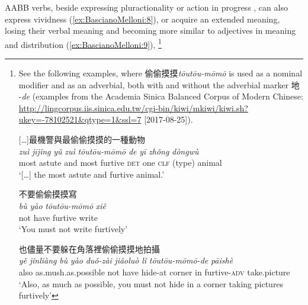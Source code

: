 \documentclass[output=paper]{langsci/langscibook}
\begin{document}
AABB verbs, beside expressing pluractionality or action in progress %
\citep[see][]{Hu06,Ding2010}%
%
, can also express vividness (\ref{ex:BascianoMelloni:8}), or acquire an
extended meaning, losing their verbal meaning and becoming more similar
to adjectives in meaning and distribution (\ref{ex:BascianoMelloni:9}),%
%
\footnote{See the following
  examples, where
  偷偷摸摸\emph{tōu}\tld{}\emph{tōu-mō}\tld{}\emph{mō}
  is used as a nominal modifier  and as an adverbial, both with
   and without  the
  adverbial marker 地 -\emph{de} (examples from the Academia Sinica
  Balanced Corpus of Modern Chinese:
  \url{http://lingcorpus.iis.sinica.edu.tw/cgi-bin/kiwi/mkiwi/kiwi.sh?ukey=-78102521&qtype=1&ssl=7}
  [2017-08-25]).

% 

\ea\label{fnex:basciano:a}
{[}\ldots{}{]}最機警與最偷偷摸摸的一種動物\\
\gll \emph{zuì} \emph{jījǐng} \emph{yǔ} \emph{zuì} \emph{tōu}\tld{}\emph{tōu-mō}\tld{}\emph{mō} \emph{de} \emph{yī} \emph{zhǒng} \emph{dòngwù}\\
most astute and most furtive \textsc{det} one {\textsc{clf} (type)} animal\\
\glt `{[}\ldots{}{]} the most astute and furtive animal.'

\ex
\ea\label{fnex:basciano:bi}
不要偷偷摸摸寫\\
\gll \emph{bù} \emph{yào} \emph{tōu}\tld{}\emph{tōu-mō}\tld{}\emph{mō} \emph{xiě}\\
not have furtive write\\
\glt `You must not write furtively'

\ex\label{fnex:basciano:bii}
也儘量不要躲在角落裡偷偷摸摸地拍攝\\
\gll\emph{yě} \emph{jǐnliàng} \emph{bù} \emph{yào} \emph{duǒ-zài} \emph{jiǎoluò} \emph{lǐ} \emph{tōu}\tld{}\emph{tōu-mō}\tld{}\emph{mō-de} \emph{pāishè}\\
also as.mush.as.possible not have hide-at corner in
  furtive-\textsc{adv} take.picture\\
\glt `Also, as much as possible, you must not hide in a corner taking
  pictures furtively'
\z
\z

}
\end{document}
